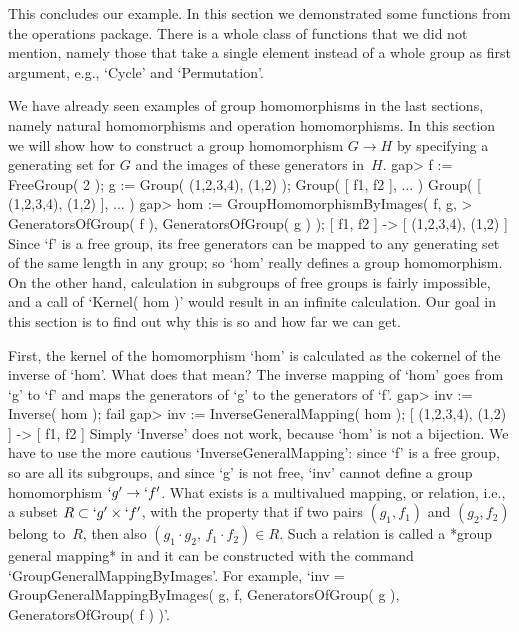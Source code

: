 This  concludes  our  example.   In  this  section  we demonstrated  some
functions  from  the operations  package.   There  is  a  whole class  of
functions that  we  did  not mention, namely  those that  take  a  single
element instead  of a  whole  group  as first argument, e.g., `Cycle' and
`Permutation'.


We  have already    seen examples of  group  homomorphisms   in the  last
sections, namely  natural homomorphisms and  operation homomorphisms.  In
this section we will show how to construct  a group homomorphism $G\to H$
by specifying a generating set for $G$ and the images of these generators
in~$H$.
\beginexample
    gap> f := FreeGroup( 2 ); g := Group( (1,2,3,4), (1,2) );
    Group( [ f1, f2 ], ... )
    Group( [ (1,2,3,4), (1,2) ], ... )
    gap> hom := GroupHomomorphismByImages( f, g,
    >           GeneratorsOfGroup( f ), GeneratorsOfGroup( g ) );
    [ f1, f2 ] -> [ (1,2,3,4), (1,2) ]
\endexample
Since `f'  is a  free  group, its free  generators  can be mapped  to any
generating set of the same length in any group; so `hom' really defines a
group homomorphism.  On the other  hand, calculation in subgroups of free
groups is fairly impossible, and  a call of  `Kernel( hom )' would result
in an infinite calculation. Our goal  in this section is  to find out why
this is so and how far we can get.

First, the kernel of the homomorphism `hom' is calculated as the cokernel
of the inverse  of `hom'. What   does that mean?  The inverse  mapping of
`hom' goes from  `g'  to  `f' and  maps  the  generators  of `g'   to the
generators of `f'.
\beginexample
    gap> inv := Inverse( hom );
    fail
    gap> inv := InverseGeneralMapping( hom );
    [ (1,2,3,4), (1,2) ] -> [ f1, f2 ]
\endexample
Simply `Inverse' does not work, because `hom' is not a bijection. We have
to use the more cautious   `InverseGeneralMapping': since `f' is a   free
group, so are all its subgroups, and since  `g' is not free, `inv' cannot
define a group homomorphism  $`g' \to `f'$.  What exists is a multivalued
mapping, or relation, i.e., a subset $R\subset  `g' \times `f'$, with the
property that  if  two pairs $(g_1,f_1)$  and $(g_2,f_2)$  belong to~$R$,
then also $(g_1\cdot g_2,\,f_1\cdot f_2)\in R$. Such a relation is called
a *group general mapping* in  {\GAP} and it  can be constructed with  the
command    `GroupGeneralMappingByImages'.     For   example,   `inv     =
GroupGeneralMappingByImages(    g,      f,    GeneratorsOfGroup(   g   ),
GeneratorsOfGroup( f ) )'.

